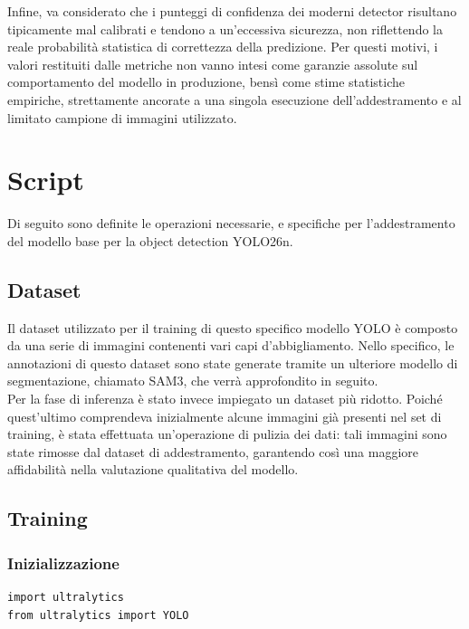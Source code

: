 Infine, va considerato che i punteggi di confidenza dei moderni detector risultano tipicamente mal calibrati e tendono a un'eccessiva sicurezza,
non riflettendo la reale probabilità statistica di correttezza della predizione.
Per questi motivi, i valori restituiti dalle metriche non vanno intesi come garanzie assolute sul comportamento del modello in produzione, bensì come stime statistiche empiriche,
strettamente ancorate a una singola esecuzione dell'addestramento e al limitato campione di immagini utilizzato. \cite{detector_calibration}

\newpage

\section{Script}
Di seguito sono definite le operazioni necessarie, e specifiche per l'addestramento del modello base per la object detection YOLO26n.

\subsection{Dataset}
Il dataset utilizzato per il training di questo specifico modello YOLO è composto da una serie di immagini contenenti vari capi d'abbigliamento. Nello specifico, le annotazioni di questo dataset sono state generate tramite un ulteriore modello di segmentazione, chiamato SAM3, che verrà approfondito in seguito. \\
\noindent
Per la fase di inferenza è stato invece impiegato un dataset più ridotto. Poiché quest'ultimo comprendeva inizialmente alcune immagini già presenti nel set di training, è stata effettuata un'operazione di pulizia dei dati: tali immagini sono state rimosse dal dataset di addestramento, garantendo così una maggiore affidabilità nella valutazione qualitativa del modello.

\subsection{Training}

\subsubsection{Inizializzazione}

\begin{lstlisting}
import ultralytics
from ultralytics import YOLO
\end{lstlisting}

